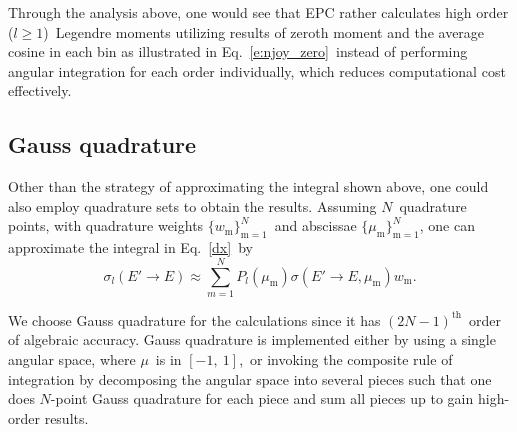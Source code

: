 \documentclass[review]{elsarticle}
\newcommand{\dxcs}{\sigma_l(E'\to E)}
\begin{document}
Through the analysis above, one would see that EPC rather calculates high order ($l\ge 1$)\ Legendre moments utilizing results of zeroth moment and the average cosine in each bin as illustrated in Eq.~\eqref{e:njoy_zero}\ instead of performing angular integration for each order individually, which reduces computational cost effectively.
\subsection{Gauss quadrature}
Other than the strategy of approximating the integral shown above, one could also employ quadrature sets to obtain the results. Assuming $N$~quadrature points, with quadrature weights $\{w_\mathrm{m}\}_\mathrm{m=1}^N$~and abscissae $\{\mu_\mathrm{m}\}_\mathrm{m=1}^N$, one can approximate the integral in Eq.~\eqref{dx}~by
\begin{equation}
\dxcs\approx\sum\limits_{m=1}^{N}P_l(\mu_{\mathrm{m}})\sigma(E'\to E,\mu_\mathrm{m})w_\mathrm{m}.
\end{equation}

We choose Gauss quadrature for the calculations since it has $(2N-1)^\mathrm{th}$~order of algebraic accuracy. Gauss quadrature is implemented either by using a single angular space, where $\mu$~is in $[-1,~1]$,~or invoking the composite rule of integration by decomposing the angular space into several pieces such that one does $N$-point Gauss quadrature for each piece and sum all pieces up to gain high-order results.
\end{document}
